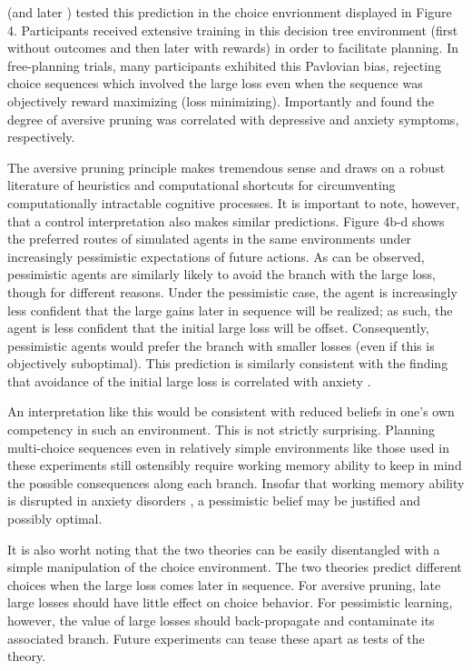 \documentclass[11pt]{article} %
\begin{document}
\cite{Huys2012} (and later \cite{Lally2017}) tested this prediction in the choice envrionment displayed in Figure 4. Participants received extensive training in this decision tree environment (first without outcomes and then later with rewards) in order to facilitate planning. In free-planning trials, many participants exhibited this Pavlovian bias, rejecting choice sequences which involved the large loss even when the sequence was objectively reward maximizing (loss minimizing). Importantly \cite{Huys2012} and \cite{Lally2017} found the degree of aversive pruning was correlated with depressive and anxiety symptoms, respectively.

The aversive pruning principle makes tremendous sense and draws on a robust literature of heuristics and computational shortcuts for circumventing computationally intractable cognitive processes. It is important to note, however, that a control interpretation also makes similar predictions. Figure 4b-d shows the preferred routes of simulated agents in the same environments under increasingly pessimistic expectations of future actions. As can be observed, pessimistic agents are similarly likely to avoid the branch with the large loss, though for different reasons. Under the pessimistic case, the agent is increasingly less confident that the large gains later in sequence will be realized; as such, the agent is less confident that the initial large loss will be offset. Consequently, pessimistic agents would prefer the branch with smaller losses (even if this is objectively suboptimal). This prediction is similarly consistent with the finding that avoidance of the initial large loss is correlated with anxiety \cite{Lally2017}.

An interpretation like this would be consistent with reduced beliefs in one's own competency in such an environment. This is not strictly surprising. Planning multi-choice sequences even in relatively simple environments like those used in these experiments still ostensibly require working memory ability to keep in mind the possible consequences along each branch. Insofar that working memory ability is disrupted in anxiety disorders \citep{Moran2016}, a pessimistic belief may be justified and possibly optimal.

It is also worht noting that the two theories can be easily disentangled with a simple manipulation of the choice environment. The two theories predict different choices when the large loss comes later in sequence. For aversive pruning, late large losses should have little effect on choice behavior. For pessimistic learning, however, the value of large losses should back-propagate and contaminate its associated branch. Future experiments can tease these apart as tests of the theory.
\end{document}
